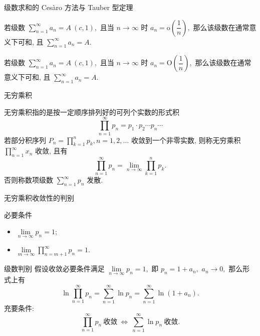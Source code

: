 
\begin{frame}{级数求和的 Cesàro 方法与 Tauber 型定理}

\begin{thm}[Tauber]
若级数 $\sum\limits_{n=1}^{\infty} a_n = A~(c, 1),$ 且当 $n\to\infty$ 时 $a_n = \mathrm{o} \left( \dfrac{1}{n} \right),$ 那么该级数在通常意义下可和, 且 $\sum\limits_{n=1}^{\infty} a_n = A.$
\end{thm}

\pause

\begin{thm}[Hardy]
若级数 $\sum\limits_{n=1}^{\infty} a_n = A~(c, 1),$ 且当 $n\to\infty$ 时 $a_n = \mathrm{O} \left( \dfrac{1}{n} \right),$ 那么该级数在通常意义下可和, 且 $\sum\limits_{n=1}^{\infty} a_n = A.$
\end{thm}

\end{frame}


\begin{frame}{无穷乘积}

\begin{Def}
无穷乘积指的是{\color{red}按一定顺序排列好}的可列个实数的形式积
\[\prod\limits_{n=1}^\infty p_n = p_1 \cdot p_2 \cdots p_n \cdots\]
\pause
若部分积序列 $P_n = \prod\limits_{k=1}^n p_k, n = 1, 2, \dots$ 收敛到一个{\color{red}非零实数}, 则称无穷乘积 $\prod\limits_{n=1}^\infty x_n$ 收敛, 且有
\[\prod\limits_{n=1}^\infty p_n = \lim\limits_{n\to\infty} \prod\limits_{k=1}^n p_k.\]
否则称数项级数 $\sum\limits_{n=1}^\infty p_n$ 发散.
\end{Def}

\end{frame}


\begin{frame}{无穷乘积收敛性的判别}

\begin{block}{必要条件}
\begin{itemize}
\item $\lim\limits_{n\to\infty} p_n = 1;$
\pause
\item $\lim\limits_{m\to\infty} \prod\limits_{n=m+1}^\infty p_n = 1.$
\end{itemize}
\end{block}

\pause

\begin{block}{级数判别}
假设收敛必要条件满足 $\lim\limits_{n\to\infty} p_n = 1,$ 即 $p_n = 1 + a_n,$ $a_n \to 0,$ 那么形式上有
\[\ln \prod\limits_{n=1}^\infty p_n = \sum\limits_{n=1}^\infty \ln p_n = \sum\limits_{n=1}^\infty \ln (1 + a_n).\]
\pause
充要条件:
\[\prod\limits_{n=1}^\infty p_n ~ \text{收敛} ~ \Longleftrightarrow ~ \sum\limits_{n=1}^\infty \ln p_n ~ \text{收敛}.\]
\end{block}

\end{frame}

